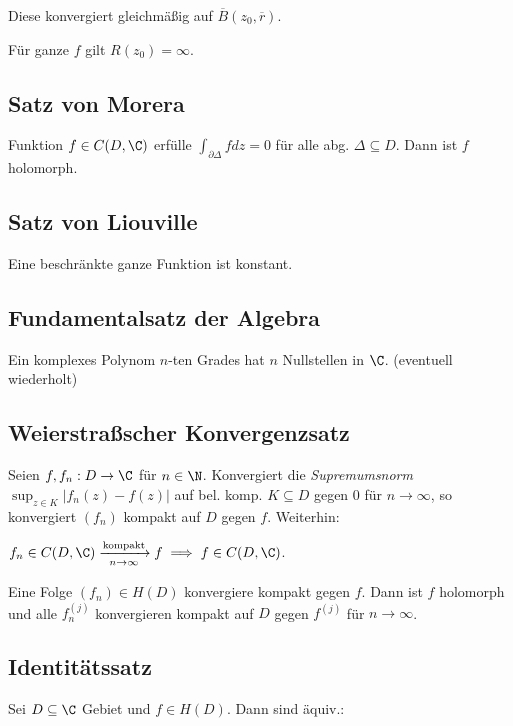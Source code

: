 Diese konvergiert gleichmäßig auf \(\overline B(z_0,\overline r)\).

Für ganze \(f\) gilt \(R(z_0)=\infty\).

\subsection*{Satz von Morera}

Funktion \(f \in C(D,\C)\) erfülle \(\int_{\partial\Delta} f dz = 0\) für alle abg. \(\Delta \subseteq D\). Dann ist \(f\) holomorph.

\subsection*{Satz von Liouville}

Eine beschränkte ganze Funktion ist konstant.

\subsection*{Fundamentalsatz der Algebra}

Ein komplexes Polynom \(n\)-ten Grades hat \(n\) Nullstellen in \(\C\). (eventuell wiederholt)

\subsection*{Weierstraßscher Konvergenzsatz}

Seien \(f, f_n : D \to \C\) für \(n \in \N\). Konvergiert die \emph{Supremumsnorm} \(\sup_{z \in K} |f_n(z)-f(z)|\) auf bel. komp. \(K \subseteq D\) gegen \(0\) für \(n \to \infty\), so konvergiert \((f_n)\) kompakt auf \(D\) gegen \(f\). Weiterhin:

\spacing

\(f_n \in C(D,\C) \xrightarrow[n \to \infty]{\text{kompakt}} f \implies f \in C(D,\C)\).

\spacing

Eine Folge \((f_n) \in H(D)\) konvergiere kompakt gegen \(f\). Dann ist \(f\) holomorph und alle \(f_n^{(j)}\) konvergieren kompakt auf \(D\) gegen \(f^{(j)}\) für \(n \to \infty\).

\subsection*{Identitätssatz}

Sei \(D \subseteq \C\) Gebiet und \(f \in H(D)\). Dann sind äquiv.:

